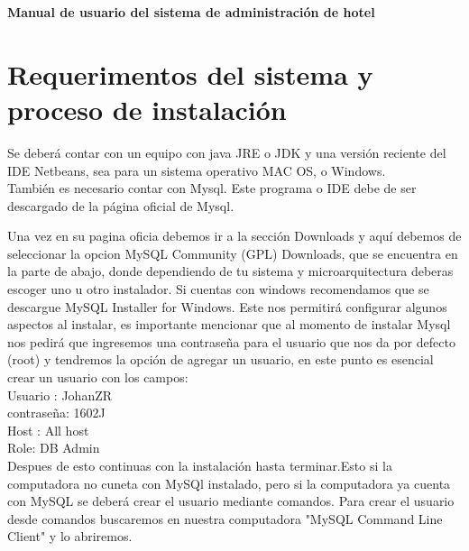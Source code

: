 \documentclass[12pt]{article}
\begin{document}
\vspace{4cm}
\begin{flushleft}
\begin{Large}
\textbf{Manual de usuario del sistema de administración de hotel}
\end{Large}

\section{Requerimentos del sistema y proceso de instalación}

\textsf{Se deberá contar con un equipo con java JRE o JDK y una versión reciente del IDE Netbeans, sea para un  sistema operativo MAC OS, o Windows.\vspace{0.5cm} \\También es necesario contar con Mysql. Este programa o IDE debe de ser descargado de la página oficial de Mysql. }

\vspace{0.5cm}
\textsf{Una vez en su pagina oficia debemos ir a la sección Downloads  y aquí debemos de seleccionar la opcion MySQL Community (GPL) Downloads, que se encuentra en la parte de abajo, donde dependiendo de tu sistema y microarquitectura deberas escoger uno u otro instalador. Si cuentas con windows recomendamos que se descargue MySQL Installer for Windows. Este nos permitirá configurar algunos aspectos al instalar, es importante mencionar que al momento de instalar Mysql nos pedirá que ingresemos una contraseña para el usuario que nos da por defecto (root) y tendremos la opción de agregar un usuario, en este punto es esencial  crear un usuario con los campos:\\
Usuario : JohanZR\\
contraseña: 1602J\\
Host : All host\\
Role: DB Admin\\
Despues de esto continuas con la instalación hasta terminar.Esto si la computadora no cuneta con MySQl instalado, pero si la computadora ya cuenta con MySQL se deberá crear el usuario mediante comandos. Para crear el usuario desde comandos buscaremos en nuestra computadora "MySQL Command Line Client" y lo abriremos.}


\end{flushleft}
\end{document}
